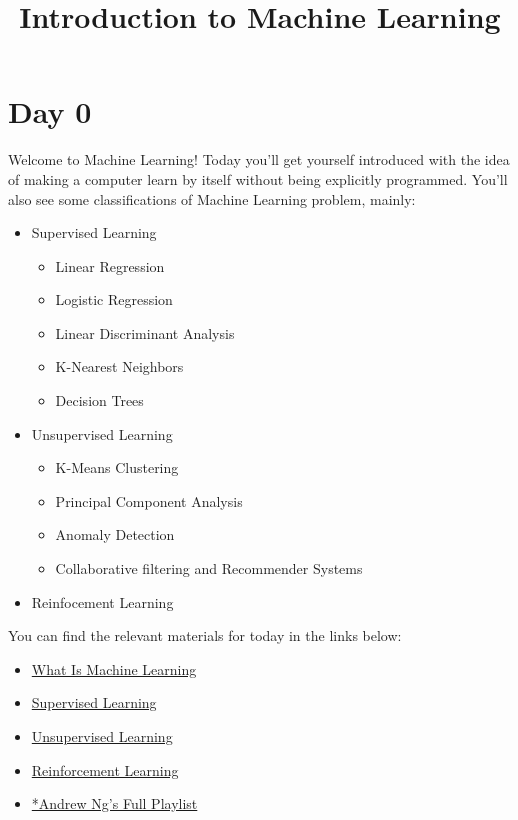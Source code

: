 \documentclass[11pt]{article}
\title{Introduction to Machine Learning}
\date{}
\begin{document}
\maketitle
\section{Day 0}
Welcome to Machine Learning! Today you'll get yourself introduced with the idea of making a computer learn by itself without being explicitly programmed. You'll also see some classifications of Machine Learning problem, mainly:
\begin{itemize}
\item Supervised Learning
\begin{itemize}
\item Linear Regression
\item Logistic Regression
\item Linear Discriminant Analysis
\item K-Nearest Neighbors
\item Decision Trees
\end{itemize}
\item Unsupervised Learning
\begin{itemize}
\item K-Means Clustering
\item Principal Component Analysis
\item Anomaly Detection
\item Collaborative filtering and Recommender Systems
\end{itemize}
\item Reinfocement Learning
\end{itemize}
You can find the relevant materials for today in the links below:
\begin{itemize}
\item \href{https://www.youtube.com/watch?v=PPLop4L2eGk}{What Is Machine Learning}
\item \href{https://www.youtube.com/watch?v=bQI5uDxrFfA}{Supervised Learning}
\item \href{https://www.youtube.com/watch?v=jAA2g9ItoAc}{Unsupervised Learning}
\item \href{https://www.youtube.com/watch?v=JgvyzIkgxF0}{Reinforcement Learning}
\item \href{https://www.youtube.com/watch?v=PPLop4L2eGk&list=PLLssT5z_DsK-h9vYZkQkYNWcItqhlRJLN}{*Andrew Ng's Full Playlist}
\end{itemize}
\end{document}
